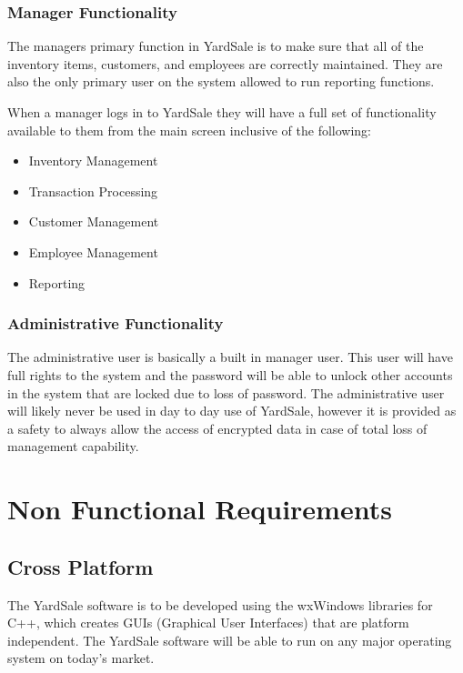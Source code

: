 \documentclass{report}
\begin{document}
    \subsubsection{Manager Functionality}
    The managers primary function in YardSale is to make sure that all
    of the inventory items, customers, and employees are correctly
    maintained. They are also the only primary user on the system
    allowed to run reporting functions.

    When a manager logs in to YardSale they will have a full set of
    functionality available to them from the main screen inclusive of
    the following:

    \begin{itemize}
        \item Inventory Management
        \item Transaction Processing
        \item Customer Management
        \item Employee Management
        \item Reporting
    \end{itemize}

    \subsubsection{Administrative Functionality}

    The administrative user is basically a built in manager user. This
    user will have full rights to the system and the password will be
    able to unlock other accounts in the system that are locked due to
    loss of password. The administrative user will likely never be
    used in day to day use of YardSale, however it is provided as a
    safety to always allow the access of encrypted data in case of
    total loss of management capability.

\section{Non Functional Requirements}

    \subsection{Cross Platform}
    The YardSale software is to be developed using the wxWindows libraries for C++,
    which creates GUIs (Graphical User Interfaces) that are
    platform independent.  The YardSale software will be able to
    run on any major operating system on today's market.
\end{document}
